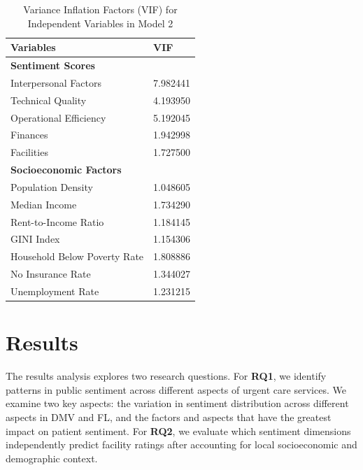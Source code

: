 \documentclass[journal,twoside,web]{ieeecolor}
\begin{document}
\begin{table}[htbp]
\centering
\caption{Variance Inflation Factors (VIF) for Independent Variables in Model 2}
\label{tab:vif}
\begin{tabular}{p{6cm}p{2cm}}
\hline
\textbf{Variables} & \textbf{VIF} \\
\hline
\textbf{Sentiment Scores} & \\
Interpersonal Factors & 7.982441 \\
Technical Quality & 4.193950 \\
Operational Efficiency & 5.192045 \\
Finances & 1.942998 \\
Facilities & 1.727500 \\
\textbf{Socioeconomic Factors} & \\
Population Density & 1.048605 \\
Median Income & 1.734290 \\
Rent-to-Income Ratio & 1.184145 \\
GINI Index & 1.154306 \\
Household Below Poverty Rate & 1.808886 \\
No Insurance Rate & 1.344027 \\
Unemployment Rate & 1.231215 \\
\hline
\end{tabular}
\end{table}

\section{Results}
The results analysis explores two research questions. For \textbf{RQ1}, we identify patterns in public sentiment across different aspects of urgent care services. We examine two key aspects: the variation in sentiment distribution across different aspects in DMV and FL, and the factors and aspects that have the greatest impact on patient sentiment. For \textbf{RQ2}, we evaluate which sentiment dimensions independently predict facility ratings after accounting for local socioeconomic and demographic context.
\end{document}
